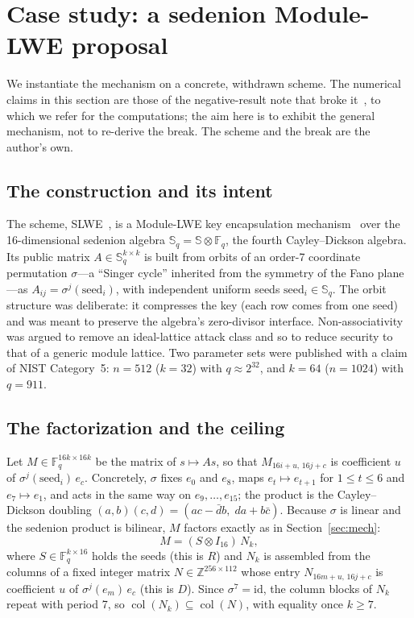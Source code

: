 \documentclass[11pt]{article}
\makeatletter
\theoremstyle{remark}
\newcommand{\F}{\mathbb{F}}
\newcommand{\Sed}{\mathbb{S}}
\DeclareMathOperator{\col}{col}
\DeclareRobustCommand{\_}{%
  \edef\@tempa{\ttdefault}%
  \ifx\f@family\@tempa\char95 \else\textunderscore\fi\penalty300\relax}
\makeatother
\begin{document}
\section{Case study: a sedenion Module-LWE proposal}\label{sec:case}

We instantiate the mechanism on a concrete, withdrawn scheme. The numerical claims in this section are those of the
negative-result note that broke it~\cite{GifNote}, to which we refer for the computations; the aim here is to exhibit the
general mechanism, not to re-derive the break. The scheme and the break are the author's own.

\subsection{The construction and its intent}

The scheme, SLWE~\cite{GifFLT}, is a Module-LWE key encapsulation mechanism~\cite{Regev,LS15} over the 16-dimensional
sedenion algebra $\Sed_q=\Sed\otimes\F_q$, the fourth Cayley--Dickson algebra. Its public matrix
$A\in\Sed_q^{k\times k}$ is built from orbits of an order-7 coordinate permutation $\sigma$---a ``Singer cycle''
inherited from the symmetry of the Fano plane---as $A_{ij}=\sigma^{j}(\mathrm{seed}_i)$, with independent uniform seeds
$\mathrm{seed}_i\in\Sed_q$. The orbit structure was deliberate: it compresses the key (each row comes from one seed) and
was meant to preserve the algebra's zero-divisor interface. Non-associativity was argued to remove an ideal-lattice
attack class and so to reduce security to that of a generic module lattice. Two parameter sets were published with a
claim of NIST Category~5: $n=512$ ($k=32$) with $q\approx2^{32}$, and $k=64$ ($n=1024$) with $q=911$.

\subsection{The factorization and the ceiling}\label{sec:ceiling}

Let $M\in\F_q^{16k\times16k}$ be the matrix of $s\mapsto As$, so that $M_{16i+u,\,16j+c}$ is coefficient $u$ of
$\sigma^{j}(\mathrm{seed}_i)\,e_c$. Concretely, $\sigma$ fixes $e_0$ and $e_8$, maps $e_t\mapsto e_{t+1}$ for
$1\le t\le6$ and $e_7\mapsto e_1$, and acts in the same way on $e_9,\dots,e_{15}$; the product is the Cayley--Dickson
doubling $(a,b)(c,d)=(ac-\bar d b,\;da+b\bar c)$. Because $\sigma$ is linear and the sedenion product is bilinear, $M$
factors exactly as in Section~\ref{sec:mech}:
\[
  M=(S\otimes I_{16})\,N_k,
\]
where $S\in\F_q^{k\times16}$ holds the seeds (this is $R$) and $N_k$ is assembled from the columns of a fixed integer
matrix $N\in\mathbb{Z}^{256\times112}$ whose entry $N_{16m+u,\,16j+c}$ is coefficient $u$ of $\sigma^{j}(e_m)\,e_c$
(this is $D$). Since $\sigma^7=\mathrm{id}$, the column blocks of $N_k$ repeat with period 7, so $\col(N_k)\subseteq\col(N)$,
with equality once $k\ge7$.
\end{document}
